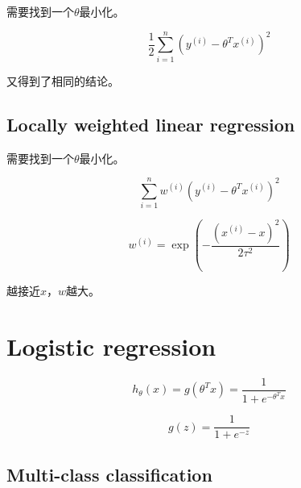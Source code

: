 \documentclass[letterpaper,11pt]{article}
\begin{document}
\begin{CJK}{UTF8}{gbsn}
需要找到一个$\theta$最小化。

$$\frac{1}{2} \sum_{i=1}^n(y^{(i)} - \theta^T x^{(i)})^2$$

又得到了相同的结论。

\subsection{Locally weighted linear regression}

需要找到一个$\theta$最小化。

$$\sum_{i=1}^n w^{(i)} (y^{(i)} - \theta^T x^{(i)})^2$$

$$w^{(i)}=\exp \left(-\frac{(x^{(i)}-x)^2}{2\tau^2}\right)$$

越接近$x$，$w$越大。

\section{Logistic regression}

$$h_\theta(x)=g(\theta^Tx)=\frac{1}{1+e^{-\theta^T x}}$$

$$g(z)=\frac{1}{1+e^{-z}}$$

\subsection{Multi-class classification}

\end{CJK}
\end{document}
